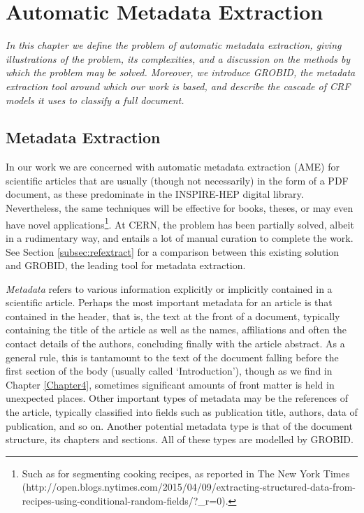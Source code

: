 
\chapter{Automatic Metadata Extraction} %

\label{Chapter3} %



\emph{In this chapter we define the problem of automatic metadata extraction, giving illustrations of the problem, its complexities, and a discussion on the methods by which the problem may be solved. Moreover, we introduce GROBID, the metadata extraction tool around which our work is based, and describe the cascade of CRF models it uses to classify a full document.}

\section{Metadata Extraction}

In our work we are concerned with automatic metadata extraction (AME) for scientific articles that are usually (though not necessarily) in the form of a PDF document, as these predominate in the INSPIRE-HEP digital library. Nevertheless, the same techniques will be effective for books, theses, or may even have novel applications\footnote{Such as for segmenting cooking recipes, as reported in The New York Times (http://open.blogs.nytimes.com/2015/04/09/extracting-structured-data-from-recipes-using-conditional-random-fields/?\_r=0).}. At CERN, the problem has been partially solved, albeit in a rudimentary way, and entails a lot of manual curation to complete the work. See Section \ref{subsec:refextract} for a comparison between this existing solution and GROBID, the leading tool for metadata extraction.

\emph{Metadata} refers to various information explicitly or implicitly contained in a scientific article. Perhaps the most important metadata for an article is that contained in the header, that is, the text at the front of a document, typically containing the title of the article as well as the names, affiliations and often the contact details of the authors, concluding finally with the article abstract. As a general rule, this is tantamount to the text of the document falling before the first section of the body (usually called `Introduction'), though as we find in Chapter \ref{Chapter4}, sometimes significant amounts of front matter is held in unexpected places. Other important types of metadata may be the references of the article, typically classified into fields such as publication title, authors, data of publication, and so on. Another potential metadata type is that of the document structure, its chapters and sections. All of these types are modelled by GROBID.

